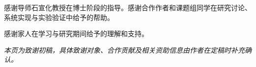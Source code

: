 \begin{ack}
感谢导师石宣化教授在博士阶段的指导。感谢合作作者和课题组同学在研究讨论、系统实现与实验验证中给予的帮助。

感谢家人在学习与研究期间给予的理解和支持。

\textit{本页为致谢初稿，具体致谢对象、合作贡献及相关资助信息由作者在定稿时补充确认。}
\end{ack}
